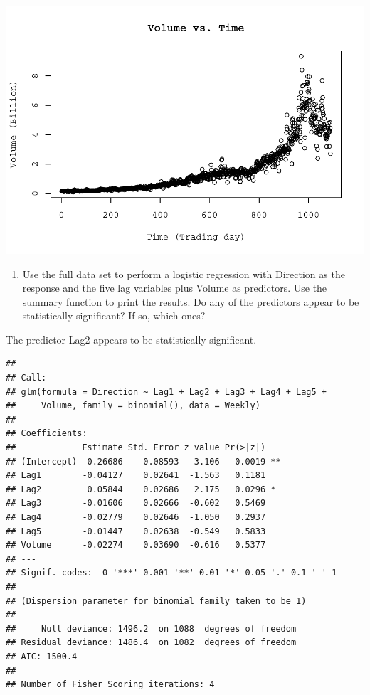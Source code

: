 \documentclass[
]{article}
\newenvironment{Shaded}{\begin{snugshade}}{\end{snugshade}}
\newcommand{\AttributeTok}[1]{\textcolor[rgb]{0.13,0.29,0.53}{#1}}
\newcommand{\FunctionTok}[1]{\textcolor[rgb]{0.13,0.29,0.53}{\textbf{#1}}}
\newcommand{\NormalTok}[1]{#1}
\newcommand{\SpecialCharTok}[1]{\textcolor[rgb]{0.81,0.36,0.00}{\textbf{#1}}}
\newcommand{\StringTok}[1]{\textcolor[rgb]{0.31,0.60,0.02}{#1}}
\providecommand{\tightlist}{%
  \setlength{\itemsep}{0pt}\setlength{\parskip}{0pt}}
\begin{document}
\begin{Shaded}
\end{Shaded}

\includegraphics{ISLR4.7.10_files/figure-latex/unnamed-chunk-4-1.pdf}

\begin{enumerate}
\def\labelenumi{(\alph{enumi})}
\setcounter{enumi}{1}
\tightlist
\item
  Use the full data set to perform a logistic regression with Direction
  as the response and the five lag variables plus Volume as predictors.
  Use the summary function to print the results. Do any of the
  predictors appear to be statistically significant? If so, which ones?
\end{enumerate}

The predictor Lag2 appears to be statistically significant.

\begin{verbatim}
## 
## Call:
## glm(formula = Direction ~ Lag1 + Lag2 + Lag3 + Lag4 + Lag5 + 
##     Volume, family = binomial(), data = Weekly)
## 
## Coefficients:
##             Estimate Std. Error z value Pr(>|z|)   
## (Intercept)  0.26686    0.08593   3.106   0.0019 **
## Lag1        -0.04127    0.02641  -1.563   0.1181   
## Lag2         0.05844    0.02686   2.175   0.0296 * 
## Lag3        -0.01606    0.02666  -0.602   0.5469   
## Lag4        -0.02779    0.02646  -1.050   0.2937   
## Lag5        -0.01447    0.02638  -0.549   0.5833   
## Volume      -0.02274    0.03690  -0.616   0.5377   
## ---
## Signif. codes:  0 '***' 0.001 '**' 0.01 '*' 0.05 '.' 0.1 ' ' 1
## 
## (Dispersion parameter for binomial family taken to be 1)
## 
##     Null deviance: 1496.2  on 1088  degrees of freedom
## Residual deviance: 1486.4  on 1082  degrees of freedom
## AIC: 1500.4
## 
## Number of Fisher Scoring iterations: 4
\end{verbatim}
\end{document}
